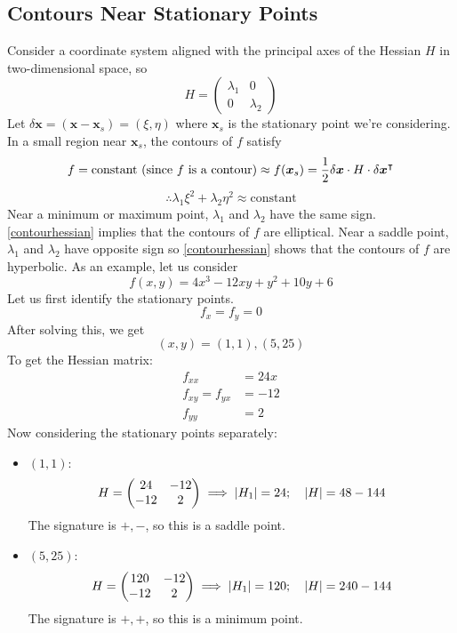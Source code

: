 \documentclass{article}
\begin{document}
	\subsection{Contours Near Stationary Points}
	Consider a coordinate system aligned with the principal axes of the Hessian $H$ in two-dimensional space, so
	\[ H = \begin{pmatrix}
		\lambda_1 & 0 \\ 0 & \lambda_2
	\end{pmatrix} \]
	Let $\delta \bm x = (\bm x - \bm x_s) = (\xi, \eta)$ where $\bm x_s$ is the stationary point we're considering. In a small region near $\bm x_s$, the contours of $f$ satisfy
	\[ f = \text{constant (since $f$ is a contour)} \approx f(\bm x_s) = \frac{1}{2}\delta \bm x \cdot H \cdot \delta \bm x^\intercal \]
	\begin{equation}\label{contourhessian}
		\therefore \lambda_1 \xi^2 + \lambda_2 \eta^2 \approx \text{constant}
	\end{equation}
	Near a minimum or maximum point, $\lambda_1$ and $\lambda_2$ have the same sign. \eqref{contourhessian} implies that the contours of $f$ are elliptical. Near a saddle point, $\lambda_1$ and $\lambda_2$ have opposite sign so \eqref{contourhessian} shows that the contours of $f$ are hyperbolic. As an example, let us consider
	\[ f(x,y) = 4x^3 - 12xy + y^2 + 10y + 6 \]
	Let us first identify the stationary points.
	\[ f_x = f_y = 0 \]
	After solving this, we get
	\[ (x,y) = (1, 1), (5, 25) \]
	To get the Hessian matrix:
	\begin{align*}
		f_{xx} &= 24x \\
		f_{xy} = f_{yx} &= -12 \\
		f_{yy} &= 2
	\end{align*}
	Now considering the stationary points separately:
	\begin{itemize}
		\item $(1, 1)$:
		\[ H = \begin{pmatrix}
			24 & -12 \\ -12 & 2
		\end{pmatrix} \implies \abs{H_1} = 24;\quad \abs{H} = 48-144 \]
		The signature is $+, -$, so this is a saddle point.
		\item $(5, 25)$:
		\[ H = \begin{pmatrix}
			120 & -12 \\ -12 & 2
		\end{pmatrix} \implies \abs{H_1} = 120;\quad \abs{H} = 240-144 \]
		The signature is $+, +$, so this is a minimum point.
	\end{itemize}
\end{document}
